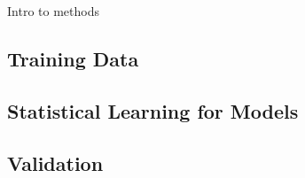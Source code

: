 
Intro to methods

\subsection{Training Data}
\label{sec:training}


\subsection{Statistical Learning for Models}
\label{sec:statmodel}


\subsection{Validation}
\label{sec:valid}


